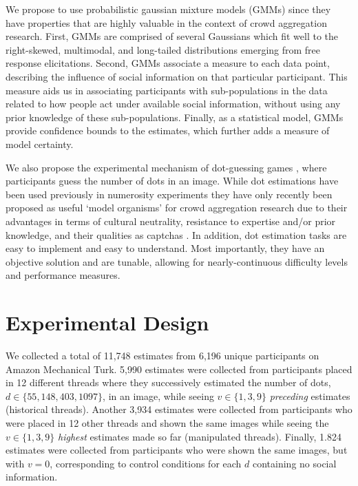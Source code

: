 \documentclass[9pt,a4paper,twocolumn,lineno]{article}
\begin{document}
We propose to use probabilistic gaussian mixture models (GMMs) since they have properties that are highly valuable in the context of crowd aggregation research. First, GMMs are comprised of several Gaussians which fit well to the right-skewed, multimodal, and long-tailed distributions emerging from free response elicitations. Second, GMMs associate a measure to each data point, describing the influence of social information on that particular participant. This measure aids us in associating participants with sub-populations in the data related to how people act under available social information, without using any prior knowledge of these sub-populations. Finally, as a statistical model, GMMs provide confidence bounds to the estimates, which further adds a measure of model certainty.

We also propose the experimental mechanism of dot-guessing games \cite{horton2010dot}, where participants guess the number of dots in an image. While dot estimations have been used previously in numerosity experiments \cite{minturn1951effect, indow1977scaling, krueger1982single} they have only recently been proposed as useful ‘model organisms’ for crowd aggregation research \cite{horton2010dot, ugander2015wisdom} due to their advantages in terms of cultural neutrality, resistance to expertise and/or prior knowledge, and their qualities as captchas \cite{von2008recaptcha}. In addition, dot estimation tasks are easy to implement and easy to understand. Most importantly, they have an objective solution and are tunable, allowing for nearly-continuous difficulty levels and performance measures.

\section*{Experimental Design}
We collected a total of 11,748 estimates from 6,196 unique participants on Amazon Mechanical Turk. 5,990 estimates were collected from participants placed in 12 different threads where they successively estimated the number of dots, $d \in \{55,148,403,1097\}$, in an image, while seeing $v \in \{1,3,9\}$ \textit{preceding} estimates (historical threads). Another 3,934 estimates were collected from participants who were placed in 12 other threads and shown the same images while seeing the $v \in \{1,3,9\}$ \textit{highest} estimates made so far (manipulated threads). Finally, 1.824 estimates were collected from participants who were shown the same images, but with $v=0$, corresponding to control conditions for each $d$ containing no social information. 
\end{document}
